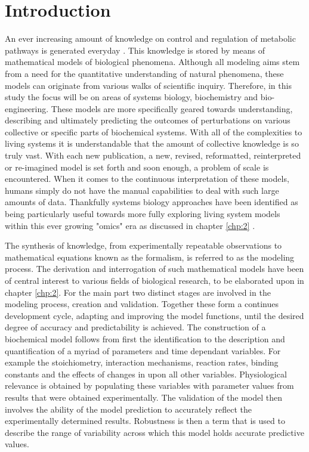 \chapter{Introduction} \label{chp:1}
An ever increasing amount of knowledge on control and regulation of metabolic pathways is generated everyday \cite{Boogerd2007, Khalil2015}. This knowledge is stored by means of mathematical models of biological phenomena. Although all modeling aims stem from a need for the quantitative understanding of natural phenomena, these models can originate from various walks of scientific inquiry. Therefore, in this study the focus will be on areas of systems biology, biochemistry and bio-engineering. These models are more specifically geared towards understanding, describing and ultimately predicting the outcomes of perturbations on various collective or specific parts of biochemical systems. With all of the complexities to living systems it is understandable that the amount of collective knowledge is so truly vast. With each new publication, a new, revised, reformatted, reinterpreted or re-imagined model is set forth and soon enough, a problem of scale is encountered. When it comes to the continuous interpretation of these models, humans simply do not have the manual capabilities to deal with such large amounts of data. Thankfully systems biology approaches have been identified as being particularly useful towards more fully exploring living system models within this ever growing "omics" era as discussed in chapter \ref{chp:2} \cite{Kell2006, Ho2008, Lee2006, Knudsen2004, Bleicher2003, Steuer2003}. 

The synthesis of knowledge, from experimentally repeatable observations to mathematical equations known as the formalism, is referred to as the modeling process. The derivation and interrogation of such mathematical models have been of central interest to various fields of biological research, to be elaborated upon in chapter \ref{chp:2}. For the main part two distinct stages are involved in the modeling process, creation and validation. Together these form a continues development cycle, adapting and improving the model functions, until the desired degree of accuracy and predictability is achieved. The construction of a biochemical model follows from first the identification to the description and quantification of a myriad of parameters and time dependant variables. For example the stoichiometry, interaction mechanisms, reaction rates, binding constants and the effects of changes in \pH upon all other variables. Physiological relevance is obtained by populating these variables with parameter values from results that were obtained experimentally. The validation of the model then involves the ability of the model prediction to accurately reflect the experimentally determined results. Robustness is then a term that is used to describe the range of variability across which this model holds accurate predictive values.

